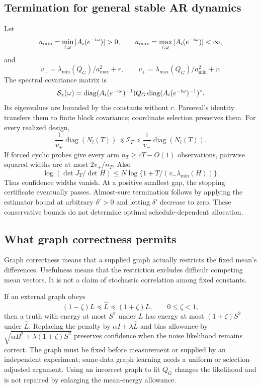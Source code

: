 \documentclass[11pt]{article}
\begin{document}
\subsection{Termination for general stable AR dynamics}
Let
\[
a_{\min}=\min_{i,\omega}|A_i(e^{-{\rm i}\omega})|>0,\qquad
a_{\max}=\max_{i,\omega}|A_i(e^{-{\rm i}\omega})|<\infty,
\]
and
\begin{equation}
v_-=\lambda_{\min}(Q_G)/a_{\max}^2+r,\qquad
v_+=\lambda_{\max}(Q_G)/a_{\min}^2+r.
\end{equation}
The spectral covariance matrix is
\begin{equation}
\mathcal S_z(\omega)=
\operatorname{diag}(A_i(e^{-{\rm i}\omega})^{-1})Q_G
\operatorname{diag}(A_i(e^{-{\rm i}\omega})^{-1})^*.
\label{eq:spectrum}
\end{equation}
Its eigenvalues are bounded by the constants without $r$. Parseval's identity transfers them to finite block covariance; coordinate selection preserves them. For every realized design,
\begin{equation}
\boxed{\frac1{v_+}\operatorname{diag}(N_i(T))
\preceq\mathcal I_T\preceq\frac1{v_-}\operatorname{diag}(N_i(T)).}
\label{eq:information-bounds}
\end{equation}
If forced cyclic probes give every arm $n_T\ge cT-O(1)$ observations, pairwise squared widths are at most $2v_+/n_T$. Also
\[
\log(\det J_T/\det H)\le N\log\{1+T/(v_-\lambda_{\min}(H))\}.
\]
Thus confidence widths vanish. At a positive smallest gap, the stopping certificate eventually passes. Almost-sure termination follows by applying the estimator bound at arbitrary $\delta'>0$ and letting $\delta'$ decrease to zero. These conservative bounds do not determine optimal schedule-dependent allocation.

\subsection{What graph correctness permits}
Graph correctness means that a supplied graph actually restricts the fixed mean's differences. Usefulness means that the restriction excludes difficult competing mean vectors. It is not a claim of stochastic correlation among fixed constants.

If an external graph obeys
\[
(1-\zeta)L\preceq\widehat L\preceq(1+\zeta)L,\qquad0\le\zeta<1,
\]
then a truth with energy at most $S^2$ under $L$ has energy at most $(1+\zeta)S^2$ under $\widehat L$. Replacing the penalty by $\alpha I+\lambda\widehat L$ and bias allowance by $\sqrt{\alpha B^2+\lambda(1+\zeta)S^2}$ preserves confidence when the noise likelihood remains correct. The graph must be fixed before measurement or supplied by an independent experiment; same-data graph learning needs a uniform or selection-adjusted argument. Using an incorrect graph to fit $Q_G$ changes the likelihood and is not repaired by enlarging the mean-energy allowance.
\end{document}
